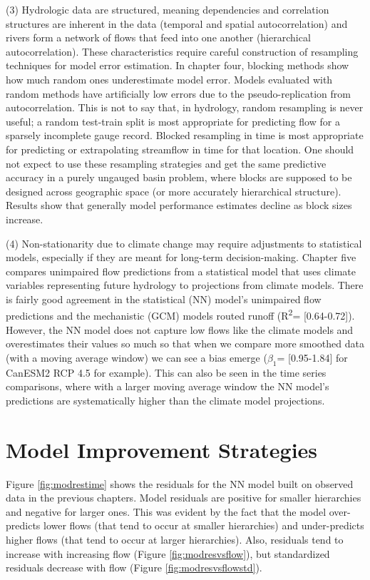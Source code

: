 (3) Hydrologic data are structured, meaning dependencies and correlation structures are inherent in the data (temporal and spatial autocorrelation) and rivers form a network of flows that feed into one another (hierarchical autocorrelation). These characteristics require careful construction of resampling techniques for model error estimation. In chapter four, blocking methods show how much random ones underestimate model error. Models evaluated with random methods have artificially low errors due to the pseudo-replication from autocorrelation. This is not to say that, in hydrology, random resampling is never useful; a random test-train split is most appropriate for predicting flow for a sparsely incomplete gauge record. Blocked resampling in time is most appropriate for predicting or extrapolating streamflow in time for that location. One should not expect to use these resampling strategies and get the same predictive accuracy in a purely ungauged basin problem, where blocks are supposed to be designed across geographic space (or more accurately hierarchical structure). Results show that generally model performance estimates decline as block sizes increase. 

(4) Non-stationarity due to climate change may require adjustments to statistical models, especially if they are meant for long-term decision-making. Chapter five compares unimpaired flow predictions from a statistical model that uses climate variables representing future hydrology to projections from climate models. There is fairly good agreement in the statistical (NN) model's unimpaired flow predictions and the mechanistic (GCM) models routed runoff (R\textsuperscript{2}= [0.64-0.72]). However, the NN model does not capture low flows like the climate models and overestimates their values so much so that when we compare more smoothed data (with a moving average window) we can see a bias emerge ($\beta_1$= [0.95-1.84] for CanESM2 RCP 4.5 for example). This can also be seen in the time series comparisons, where with a larger moving average window the NN model's predictions are systematically higher than the climate model projections.

\section{Model Improvement Strategies}
Figure \ref{fig:modrestime} shows the residuals for the NN model built on observed data in the previous chapters. Model residuals are positive for smaller hierarchies and negative for larger ones. This was evident by the fact that the model over-predicts lower flows (that tend to occur at smaller hierarchies) and under-predicts higher flows (that tend to occur at larger hierarchies). Also, residuals tend to increase with increasing flow (Figure \ref{fig:modresvsflow}), but standardized residuals decrease with flow (Figure \ref{fig:modresvsflowstd}). 


